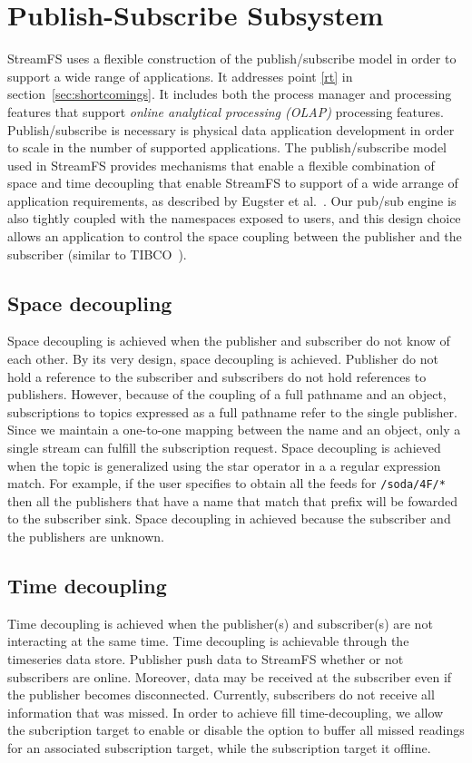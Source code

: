 \section{Publish-Subscribe Subsystem}
\label{sec:ProcMngtSchedMain}

StreamFS uses a flexible construction of the publish/subscribe model in order to support a wide range of applications.
It addresses point \ref{rt} in section~\ref{sec:shortcomings}.  It includes both the process manager and processing
features that support \emph{online analytical processing (OLAP)} processing features.
Publish/subscribe is necessary is physical data application development in order to scale in the number of supported
applications.  The publish/subscribe model used in StreamFS provides mechanisms that enable a flexible combination 
of space and time decoupling that enable StreamFS to support of a wide arrange of application requirements, as described by
Eugster et al.~\cite{eugster}.
Our pub/sub engine is also tightly coupled with the namespaces exposed to users, and this design choice allows an application
to control the space coupling between the publisher and the subscriber (similar to TIBCO~\cite{tibco}).  

\subsection{Space decoupling}
Space decoupling is achieved when the publisher and subscriber do not know of each other.
By its very design, space decoupling is achieved.  Publisher do not hold a reference to the subscriber and subscribers do not
hold references to publishers.  However, because of the coupling of a full pathname and an object, subscriptions to topics
expressed as a full pathname refer to the single publisher.  Since we maintain a one-to-one mapping between the
name and an object, only a single stream can fulfill the subscription request.  Space decoupling is achieved when the 
topic is generalized using the star operator in a a regular expression match.  For example, if the user specifies
to obtain all the feeds for \texttt{/soda/4F/*} then all the publishers that have a name that match that prefix will be fowarded
to the subscriber sink.  Space decoupling in achieved because the subscriber and the publishers are unknown.

\subsection{Time decoupling}
Time decoupling is achieved when the publisher(s) and subscriber(s) are not interacting at the same time.
Time decoupling is achievable through the timeseries data store.  Publisher push data to StreamFS whether or not subscribers are
online.  Moreover, data may be received at the subscriber even if the publisher becomes disconnected.  Currently, subscribers do
not receive all information that was missed.  In order to achieve fill time-decoupling, we allow the subcription
target to enable or disable the option to buffer all missed readings for an associated subscription target, while the subscription
target it offline.

